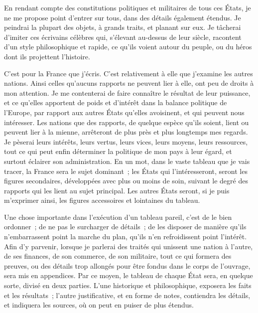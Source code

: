 \documentclass[french,twoside]{book} %
\begin{document}
En rendant compte des constitutions politiques et militaires de tous ces États, je ne me propose point d’entrer sur tous, dans des détails également étendus. Je peindrai la plupart des objets, à grands traits, et planant sur eux. Je tâcherai d’imiter ces écrivains célèbres qui, s’élevant au-dessus de leur siècle, racontent d’un style philosophique et rapide, ce qu’ils voient autour du peuple, ou du héros dont ils projettent l’histoire.\par
C’est pour la France que j’écris. C’est relativement à elle que j’examine les autres nations. Ainsi celles qu’aucuns rapports ne peuvent lier à elle, ont peu de droits à mon attention. Je me contenterai de faire connaître le résultat de leur puissance, et ce qu’elles apportent de poids et d’intérêt dans la balance politique de l’Europe, par rapport aux autres États qu’elles avoisinent, et qui peuvent nous intéresser. Les nations que des rapports, de quelque espèce qu’ils soient, lient ou peuvent lier à la mienne, arrêteront de plus près et plus longtemps mes regards. Je pèserai leurs intérêts, leurs vertus, leurs vices, leurs moyens, leurs ressources, tout ce qui peut enfin déterminer la politique de mon pays à leur égard, et surtout éclairer son administration. En un mot, dans le vaste tableau que je vais tracer, la France sera le sujet dominant ; les États qui l’intéresseront, seront les figures secondaires, développées avec plus ou moins de soin, suivant le degré des rapports qui les lient au sujet principal. Les autres États seront, si je puis m’exprimer ainsi, les figures accessoires et lointaines du tableau.\par
Une chose importante dans l’exécution d’un tableau pareil, c’est de le bien ordonner ; de ne pas le surcharger de détails ; de les disposer de manière qu’ils n’embarrassent point la marche du plan, qu’ils n’en refroidissent point l’intérêt. Afin d’y parvenir, lorsque je parlerai des traités qui unissent une nation à l’autre, de ses finances, de son commerce, de son militaire, tout ce qui formera des preuves, ou des détails trop allongés pour être fondus dans le corps de l’ouvrage, sera mis en appendices. Par ce moyen, le tableau de chaque État sera, en quelque sorte, divisé en deux parties. L’une historique et philosophique, exposera les faits et les résultats ; l’autre justificative, et en forme de notes, contiendra les détails, et indiquera les sources, où on peut en puiser de plus étendus.\par
\end{document}
